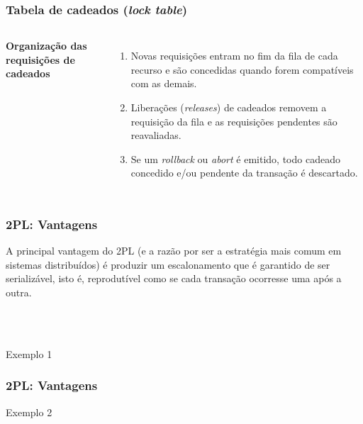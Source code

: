 \documentclass{beamer}
\begin{document}
    
\begin{frame}
    \frametitle{Tabela de cadeados (\emph{lock table})}
    \begin{columns}[c] %
    
    
    
        \textbf{Organização das requisições de cadeados}
        \begin{enumerate}
            \item Novas requisições entram no fim da fila de cada recurso e são concedidas quando forem compatíveis com as demais.
            \item Liberações (\emph{releases}) de cadeados removem a requisição da fila e as requisições pendentes são reavaliadas.
            \item Se um \emph{rollback} ou \emph{abort} é emitido, todo cadeado concedido e/ou pendente da transação é descartado.
        \end{enumerate}
        \end{columns}
\end{frame}


\begin{frame}
    \frametitle{2PL: Vantagens}

    A principal vantagem do 2PL (e a razão por ser a estratégia mais comum em sistemas distribuídos) é produzir um escalonamento que é garantido de ser serializável, isto é, reprodutível como se cada transação ocorresse uma após a outra.
    
    \\~\\
    \begin{example}{Exemplo 1}
    \end{example}
\end{frame}


\begin{frame}
    \frametitle{2PL: Vantagens}

    \begin{example}{Exemplo 2}
    \end{example}

\end{frame}
\end{document}
